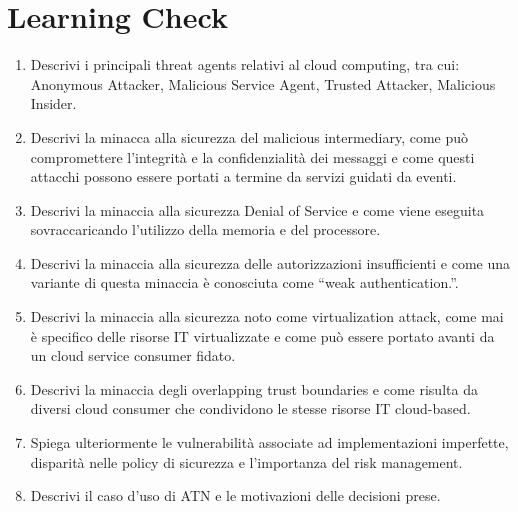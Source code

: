 \section{Learning Check}
\begin{enumerate}
    \item Descrivi i principali threat agents relativi al cloud computing, tra cui: Anonymous Attacker, Malicious Service Agent, Trusted Attacker, Malicious Insider.
    \item Descrivi la minacca alla sicurezza del malicious intermediary, come può compromettere l'integrità e la confidenzialità dei messaggi e come questi attacchi possono essere portati a termine da servizi guidati da eventi.
    \item Descrivi la minaccia alla sicurezza Denial of Service e come viene eseguita sovraccaricando l'utilizzo della memoria e del processore.
    \item Descrivi la minaccia alla sicurezza delle autorizzazioni insufficienti e come una variante di questa minaccia è conosciuta come “weak authentication.”.
    \item Descrivi la minaccia alla sicurezza noto come virtualization attack, come mai è specifico delle risorse IT virtualizzate e come può essere portato avanti da un cloud service consumer fidato.
    \item Descrivi la minaccia degli overlapping trust boundaries e come risulta da diversi cloud consumer che condividono le stesse risorse IT cloud-based.
    \item Spiega ulteriormente le vulnerabilità associate ad implementazioni imperfette, disparità nelle policy di sicurezza e l'importanza del risk management.
    \item Descrivi il caso d'uso di ATN e le motivazioni delle decisioni prese.
\end{enumerate}
